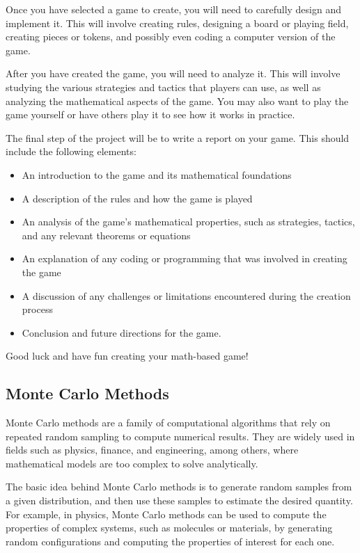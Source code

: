 \documentclass{article}
\begin{document}
\vspace{3mm}
Once you have selected a game to create, you will need to carefully design and implement it. This will involve creating rules, designing a board or playing field, creating pieces or tokens, and possibly even coding a computer version of the game.

\vspace{3mm}
After you have created the game, you will need to analyze it. This will involve studying the various strategies and tactics that players can use, as well as analyzing the mathematical aspects of the game. You may also want to play the game yourself or have others play it to see how it works in practice.

\vspace{3mm}
The final step of the project will be to write a report on your game. This should include the following elements:

\begin{itemize}
\item An introduction to the game and its mathematical foundations
\item A description of the rules and how the game is played
\item An analysis of the game's mathematical properties, such as strategies, tactics, and any relevant theorems or equations
\item An explanation of any coding or programming that was involved in creating the game
\item A discussion of any challenges or limitations encountered during the creation process
\item Conclusion and future directions for the game.
\end{itemize}

\vspace{3mm}
Good luck and have fun creating your math-based game!


\pagebreak 


\subsection*{Monte Carlo Methods}
Monte Carlo methods are a family of computational algorithms that rely on repeated random sampling to compute numerical results. They are widely used in fields such as physics, finance, and engineering, among others, where mathematical models are too complex to solve analytically.


\vspace{3mm}
The basic idea behind Monte Carlo methods is to generate random samples from a given distribution, and then use these samples to estimate the desired quantity. For example, in physics, Monte Carlo methods can be used to compute the properties of complex systems, such as molecules or materials, by generating random configurations and computing the properties of interest for each one.
\end{document}
